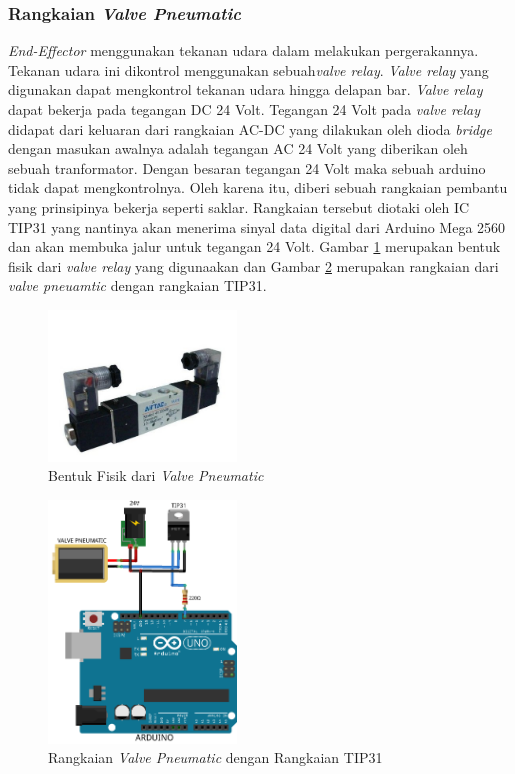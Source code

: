 \subsubsection{Rangkaian \textit{Valve Pneumatic}}
\textit{End-Effector} menggunakan tekanan udara dalam melakukan pergerakannya. Tekanan udara ini dikontrol menggunakan sebuah\textit{valve relay}. \textit{Valve relay} yang digunakan dapat mengkontrol tekanan udara hingga delapan bar. \textit{Valve relay} dapat bekerja pada tegangan DC 24 Volt. Tegangan 24 Volt pada \textit{valve relay} didapat dari keluaran dari rangkaian AC-DC yang dilakukan oleh dioda \textit{bridge} dengan masukan awalnya adalah tegangan AC 24 Volt yang diberikan oleh sebuah tranformator. Dengan besaran tegangan 24 Volt maka sebuah arduino tidak dapat mengkontrolnya. Oleh karena itu, diberi sebuah rangkaian pembantu yang prinsipinya bekerja seperti saklar. Rangkaian tersebut diotaki oleh IC TIP31 yang nantinya akan menerima sinyal data digital dari Arduino Mega 2560 dan akan membuka jalur untuk tegangan 24 Volt. Gambar \ref{pic.fisikvalve} merupakan bentuk fisik dari \textit{valve relay} yang digunaakan dan Gambar \ref{pic.skematikvalve} merupakan rangkaian dari \textit{valve pneuamtic} dengan rangkaian TIP31.
\begin{figure}[H]
	\centering
	\includegraphics[width=5cm]{gambar/relay.jpg}
	\caption{Bentuk Fisik dari \textit{Valve Pneumatic}}
	\label{pic.fisikvalve}
\end{figure}
\begin{figure}[H]
	\centering
	\includegraphics[width=5cm]{gambar/tip31.png}
	\caption{Rangkaian \textit{Valve Pneumatic} dengan Rangkaian TIP31}
	\label{pic.skematikvalve}
\end{figure}
